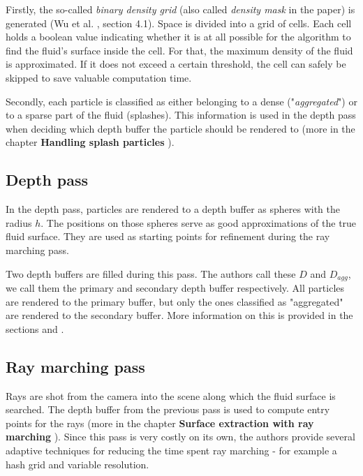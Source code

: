 Firstly, the so-called \textit{binary density grid} (also called \textit{density mask} in the paper) is generated (Wu et al. \cite{Wu:2022}, section 4.1). Space is divided into a grid of cells. Each cell holds a boolean value indicating whether it is at all possible for the algorithm to find the fluid's surface inside the cell. For that, the maximum density of the fluid is approximated. If it does not exceed a certain threshold, the cell can safely be skipped to save valuable computation time.

Secondly, each particle is classified as either belonging to a dense ("\textit{aggregated}") or to a sparse part of the fluid (splashes). This information is used in the depth pass when deciding which depth buffer the particle should be rendered to (more in the chapter \textbf{Handling splash particles }).

\subsection{Depth pass}

In the depth pass, particles are rendered to a depth buffer as spheres with the radius $h$. The positions on those spheres serve as good approximations of the true fluid surface. They are used as starting points for refinement during the ray marching pass.

Two depth buffers are filled during this pass. The authors call these $D$ and $D_{agg}$, we call them the primary and secondary depth buffer respectively. All particles are rendered to the primary buffer, but only the ones classified as "aggregated" are rendered to the secondary buffer. More information on this is provided in the sections  and .

\subsection{Ray marching pass}

Rays are shot from the camera into the scene along which the fluid surface is searched. The depth buffer from the previous pass is used to compute entry points for the rays (more in the chapter \textbf{Surface extraction with ray marching }). Since this pass is very costly on its own,  the authors provide several adaptive techniques for reducing the time spent ray marching - for example a hash grid and variable resolution.

